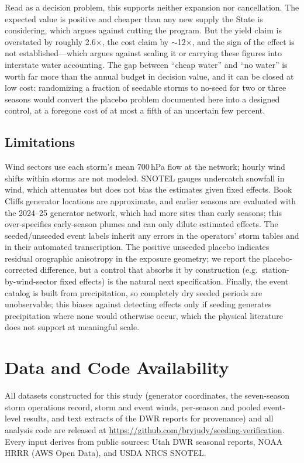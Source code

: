 \documentclass[9pt,twocolumn,twoside]{article}
\begin{document}
Read as a decision problem, this supports neither expansion nor
cancellation. The expected value is positive and cheaper than any new
supply the State is considering, which argues against cutting the program.
But the yield claim is overstated by roughly 2.6$\times$, the cost claim by
$\sim$12$\times$, and the sign of the effect is not established---which argues
against scaling it or carrying these figures into interstate water
accounting. The gap between ``cheap water'' and ``no water'' is worth far
more than the annual budget in decision value, and it can be closed at low
cost: randomizing a fraction of seedable storms to no-seed for two or three
seasons would convert the placebo problem documented here into a designed
control, at a foregone cost of at most a fifth of an uncertain few percent.

\subsection{Limitations}
Wind sectors use each storm's mean 700\,hPa flow at the network; hourly
wind shifts within storms are not modeled. SNOTEL gauges undercatch snowfall
in wind, which attenuates but does not bias the estimates given fixed
effects. Book Cliffs generator locations are approximate, and earlier seasons are
evaluated with the 2024--25 generator network, which had more sites than
early seasons; this over-specifies early-season plumes and can only dilute
estimated effects. The seeded/unseeded event labels inherit any errors in the
operators' storm tables and in their automated transcription. The positive
unseeded placebo indicates residual orographic anisotropy in the exposure
geometry; we report the placebo-corrected difference, but a control that
absorbs it by construction (e.g.\ station-by-wind-sector fixed effects) is the
natural next specification. Finally, the
event catalog is built from precipitation, so completely dry seeded periods
are unobservable; this biases against detecting effects only if seeding
generates precipitation where none would otherwise occur, which the physical
literature does not support at meaningful scale.

\section{Data and Code Availability}
All datasets constructed for this study (generator coordinates, the
seven-season storm operations record, storm and event winds, per-season and
pooled event-level results, and text extracts of the DWR reports for
provenance) and all analysis code
are released at \url{https://github.com/bryjudy/seeding-verification}. Every input derives from public
sources: Utah DWR seasonal reports, NOAA HRRR (AWS Open Data), and USDA NRCS
SNOTEL.
\end{document}
